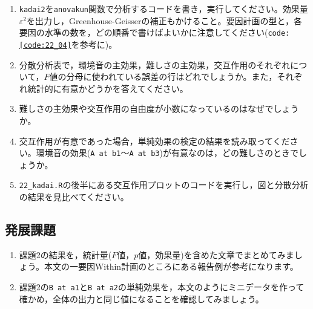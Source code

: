 \documentclass{ltjbook}
\begin{document}
\begin{enumerate}
	\item \texttt{kadai2}を\verb|anovakun|関数で分析するコードを書き，実行してください。効果量$\varepsilon^2$を出力し，Greenhouse-Geisserの補正もかけること。要因計画の型と，各要因の水準の数を，どの順番で書けばよいかに注意してください(\texttt{code:\ref{code:22_04}}を参考に)。
	\item 分散分析表で，環境音の主効果，難しさの主効果，交互作用のそれぞれについて，$F$値の分母に使われている誤差の行はどれでしょうか。また，それぞれ統計的に有意かどうかを答えてください。
	\item 難しさの主効果や交互作用の自由度が小数になっているのはなぜでしょうか。
	\item 交互作用が有意であった場合，単純効果の検定の結果を読み取ってください。環境音の効果(\verb|A at b1|〜\verb|A at b3|)が有意なのは，どの難しさのときでしょうか。
	\item \texttt{22\_kadai.R}の後半にある交互作用プロットのコードを実行し，図と分散分析の結果を見比べてください。
\end{enumerate}

\subsection{発展課題}
\begin{enumerate}
	\item 課題2の結果を，統計量($F$値，$p$値，効果量)を含めた文章でまとめてみましょう。本文の一要因Within計画のところにある報告例が参考になります。
	\item 課題2の\verb|B at a1|と\verb|B at a2|の単純効果を，本文のようにミニデータを作って確かめ，全体の出力と同じ値になることを確認してみましょう。
\end{enumerate}
\end{document}
